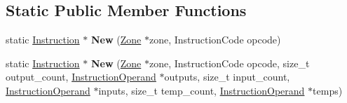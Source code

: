 \subsection*{Static Public Member Functions}
\begin{DoxyCompactItemize}
\item 
static \hyperlink{classv8_1_1internal_1_1compiler_1_1_instruction}{Instruction} $\ast$ {\bfseries New} (\hyperlink{classv8_1_1internal_1_1_zone}{Zone} $\ast$zone, Instruction\+Code opcode)\hypertarget{classv8_1_1internal_1_1compiler_1_1_instruction_a62ca7574f6fe058cae23d3a3b59866b3}{}\label{classv8_1_1internal_1_1compiler_1_1_instruction_a62ca7574f6fe058cae23d3a3b59866b3}

\item 
static \hyperlink{classv8_1_1internal_1_1compiler_1_1_instruction}{Instruction} $\ast$ {\bfseries New} (\hyperlink{classv8_1_1internal_1_1_zone}{Zone} $\ast$zone, Instruction\+Code opcode, size\+\_\+t output\+\_\+count, \hyperlink{classv8_1_1internal_1_1compiler_1_1_instruction_operand}{Instruction\+Operand} $\ast$outputs, size\+\_\+t input\+\_\+count, \hyperlink{classv8_1_1internal_1_1compiler_1_1_instruction_operand}{Instruction\+Operand} $\ast$inputs, size\+\_\+t temp\+\_\+count, \hyperlink{classv8_1_1internal_1_1compiler_1_1_instruction_operand}{Instruction\+Operand} $\ast$temps)\hypertarget{classv8_1_1internal_1_1compiler_1_1_instruction_aa1017ec442404b7318ebbba64fa33c8e}{}\label{classv8_1_1internal_1_1compiler_1_1_instruction_aa1017ec442404b7318ebbba64fa33c8e}

\end{DoxyCompactItemize}
